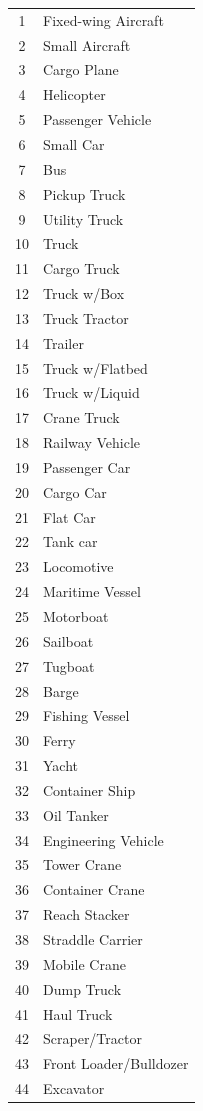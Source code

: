 \begin{center}
\begin{longtable}{|c|l|}
1 & Fixed-wing Aircraft \\
2 & Small Aircraft \\
3 & Cargo Plane \\
4 & Helicopter \\
5 & Passenger Vehicle \\
6 & Small Car \\
7 & Bus \\
8 & Pickup Truck \\
9 & Utility Truck \\
10 & Truck \\
11 & Cargo Truck \\
12 & Truck w/Box \\
13 & Truck Tractor \\
14 & Trailer \\
15 & Truck w/Flatbed \\
16 & Truck w/Liquid \\
17 & Crane Truck \\
18 & Railway Vehicle \\
19 & Passenger Car \\
20 & Cargo Car \\
21 & Flat Car \\
22 & Tank car \\
23 & Locomotive \\
24 & Maritime Vessel \\
25 & Motorboat \\
26 & Sailboat \\
27 & Tugboat \\
28 & Barge \\
29 & Fishing Vessel \\
30 & Ferry \\
31 & Yacht \\
32 & Container Ship \\
33 & Oil Tanker \\
34 & Engineering Vehicle \\
35 & Tower Crane \\
36 & Container Crane \\
37 & Reach Stacker \\
38 & Straddle Carrier \\
39 & Mobile Crane \\
40 & Dump Truck \\
41 & Haul Truck \\
42 & Scraper/Tractor \\
43 & Front Loader/Bulldozer \\
44 & Excavator \\

\end{longtable}
\end{center}
